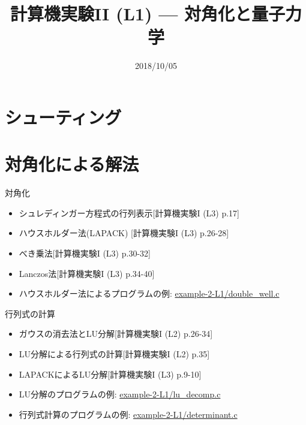 \documentclass[dvipdfmx]{beamer}
\title{計算機実験II (L1) --- 対角化と量子力学}
\date{2018/10/05}
\begin{document}
\begin{frame}
  \titlepage
  \tableofcontents
\end{frame}




\section{シューティング}











\section{対角化による解法}

\begin{frame}[t,fragile]{対角化}
  \begin{itemize}
    \setlength{\itemsep}{1em}
  \item シュレディンガー方程式の行列表示[計算機実験I (L3) p.17]
  \item ハウスホルダー法(LAPACK) [計算機実験I (L3) p.26-28]
  \item べき乗法[計算機実験I (L3) p.30-32]
  \item Lanczos法[計算機実験I (L3) p.34-40]
  \item ハウスホルダー法によるプログラムの例: \href{https://github.com/todo-group/computer-experiments/blob/master/exercise/eigenvalue_problem/double_well.c}{example-2-L1/double\_well.c}
  \end{itemize}
\end{frame}



\begin{frame}[t,fragile]{行列式の計算}
  \begin{itemize}
    \setlength{\itemsep}{1em}
  \item ガウスの消去法とLU分解[計算機実験I (L2) p.26-34]
  \item LU分解による行列式の計算[計算機実験I (L2) p.35]
  \item LAPACKによるLU分解[計算機実験I (L3) p.9-10]
  \item LU分解のプログラムの例: \href{https://github.com/todo-group/computer-experiments/blob/master/exercise/linear_system/lu_decomp.c}{example-2-L1/lu\_decomp.c}
  \item 行列式計算のプログラムの例: \href{https://github.com/todo-group/computer-experiments/blob/master/exercise/linear_system/determinant.c}{example-2-L1/determinant.c}
  \end{itemize}
\end{frame}
\end{document}
